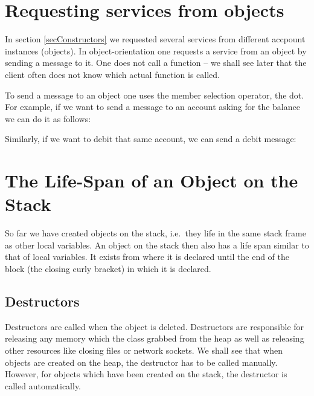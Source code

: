 
\section{Requesting services from objects}

In section \ref{secConstructors} we requested several services from
different accpount instances (objects).
In object-orientation one requests a service from an object by
sending a message to it. One does not call a function -- we shall 
see later that the client often does not know which actual function
is called.

To send a message to an object one uses the member selection operator,
the dot. For example, if we want to send a message to an account asking 
for the balance we can do it as follows:


Similarly, if we want to debit that same account, we can send a debit
message:



\section{The Life-Span of an Object on the Stack}

So far we have created objects on the stack, i.e.\ they life in the
same stack frame as other local variables. An object on the stack then
also has a life span similar to that of local variables. It exists
from where it is declared until the end of the block (the closing
curly bracket) in which it is declared.


\subsection{Destructors}

Destructors are called when the object is deleted. Destructors are 
responsible for releasing any memory which the class grabbed from the
heap as well as releasing other resources like closing files or network
sockets. We shall see that when
objects are created on the heap, the destructor has to be called manually.
However, for objects which have been created on the stack, the destructor
is called automatically.

